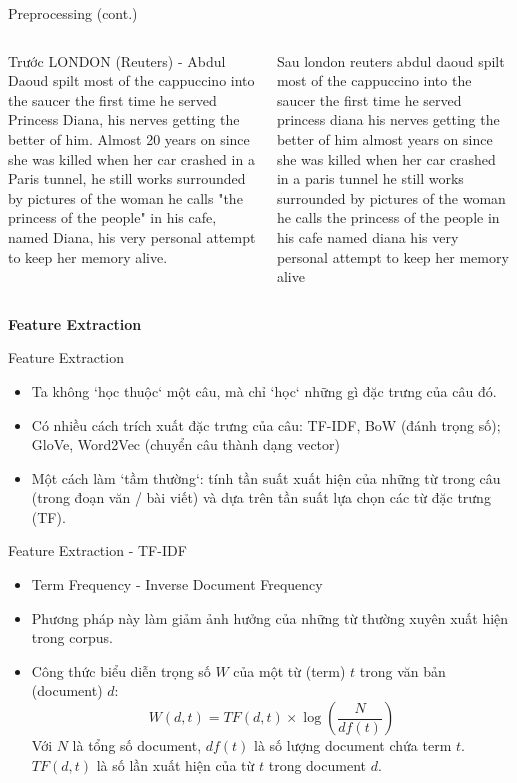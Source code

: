 \documentclass[aspectratio=169,xcolor=dvipsnames]{beamer}
\begin{document}
\begin{frame}{Preprocessing (cont.)}
\begin{columns}[c]

\begin{block}{Trước}
LONDON (Reuters) - Abdul Daoud spilt most of the cappuccino into the saucer the first time he served Princess Diana, his nerves getting the better of him. Almost 20 years on since she was killed when her car crashed in a Paris tunnel, he still works surrounded by pictures of the woman he calls "the princess of the people" in his cafe, named Diana, his very personal attempt to keep her memory alive.
\end{block}
\pause
{}
\begin{block}{Sau}
london  reuters    abdul daoud spilt most of the cappuccino into the saucer the first time he served princess diana  his nerves getting the better of him  almost  years on since she was killed when her car crashed in a paris tunnel  he still works surrounded by pictures of the woman he calls  the princess of the people  in his cafe  named diana  his very personal attempt to keep her memory alive 
\end{block}
\end{columns}
\end{frame}

\begin{frame}
	\Huge{\centerline{\textbf{Feature Extraction}}}
\end{frame}

\begin{frame}{Feature Extraction}
\begin{itemize}
\item Ta không `học thuộc` một câu, mà chỉ `học` những gì đặc trưng của câu đó.
\item Có nhiều cách trích xuất đặc trưng của câu: TF-IDF, BoW (đánh trọng số); GloVe, Word2Vec (chuyển câu thành dạng vector)
\item Một cách làm `tầm thường`: tính tần suất xuất hiện của những từ trong câu (trong đoạn văn / bài viết) và dựa trên tần suất lựa chọn các từ đặc trưng (TF).
\end{itemize}
\end{frame}

\begin{frame}{Feature Extraction - TF-IDF}
\begin{itemize}
\item Term Frequency - Inverse Document Frequency
\item Phương pháp này làm giảm ảnh hưởng của những từ thường xuyên xuất hiện trong corpus.
\item Công thức biểu diễn trọng số $W$ của một từ (term) $t$ trong văn bản (document) $d$:
$$
W(d, t) = TF(d, t) \times \log\left(\frac{N}{df(t)}\right)
$$
Với $N$ là tổng số document, $df(t)$ là số lượng document chứa term $t$. $TF(d, t)$ là số lần xuất hiện của từ $t$ trong document $d$.
\end{itemize}
\end{frame}
\end{document}
